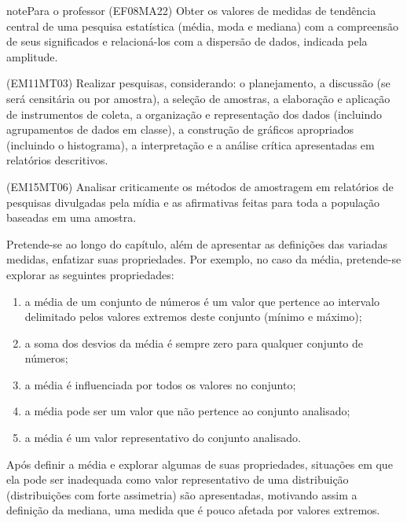 \begin{sphinxadmonition}{note}{Para o professor}
(EF08MA22) Obter os valores de medidas de tendência central de uma pesquisa estatística (média, moda e mediana) com a compreensão de seus significados e relacioná-los com a dispersão de dados, indicada pela amplitude.

(EM11MT03) Realizar pesquisas, considerando: o planejamento, a discussão (se será censitária ou por amostra), a seleção de amostras, a elaboração e aplicação de instrumentos de coleta, a organização e representação dos dados (incluindo agrupamentos de dados em classe), a construção de gráficos apropriados (incluindo o histograma), a interpretação e a análise crítica apresentadas em relatórios descritivos.


(EM15MT06) Analisar criticamente os métodos de amostragem em relatórios de pesquisas divulgadas pela mídia e as afirmativas feitas para toda a população baseadas em uma amostra.


Pretende-se ao longo do capítulo, além de apresentar as definições das variadas medidas, enfatizar suas propriedades. Por exemplo, no caso da média, pretende-se explorar as seguintes propriedades:
\begin{enumerate}
\item {} 
a média de um conjunto de números é um valor que pertence ao intervalo delimitado pelos valores extremos deste conjunto (mínimo e máximo);

\item {} 
a soma dos desvios da média é sempre zero para qualquer conjunto de números;

\item {} 
a média é influenciada por todos os valores no conjunto;

\item {} 
a média pode ser um valor que não pertence ao conjunto analisado;

\item {} 
a média é um valor representativo do conjunto analisado.

\end{enumerate}

Após definir a média e explorar algumas de suas propriedades, situações em que ela pode ser inadequada como valor representativo de uma distribuição (distribuições com forte assimetria) são apresentadas, motivando assim a definição da mediana, uma medida que é pouco afetada por valores extremos.


\end{sphinxadmonition}
